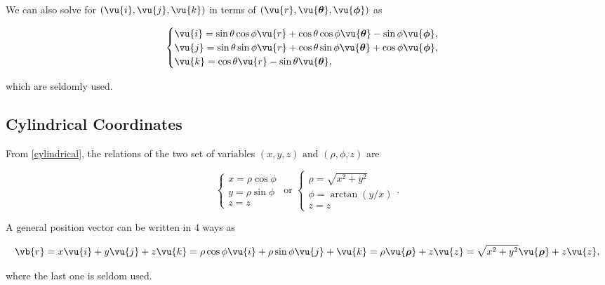 \documentclass[english,a4paper,12pt]{report}
\begin{document}
We can also solve for \((\vu{i} , \vu{j}, \vu{k} )\) in terms of \((\vu{r} , \vu{\boldsymbol{\theta } }, \vu{\boldsymbol{\phi } } )\) as  

\begin{equation}
    \begin{cases}
        \vu{i} = \sin \theta \cos \phi \vu{r} + \cos \theta \cos \phi \vu{\boldsymbol{\theta } } - \sin \phi \vu{\boldsymbol{\phi } }, \\
        \vu{j} = \sin \theta \sin \phi \vu{r} + \cos \theta \sin \phi \vu{\boldsymbol{\theta } } + \cos \phi \vu{\boldsymbol{\phi } }, \\
        \vu{k} = \cos \theta \vu{r} - \sin \theta \vu{\boldsymbol{\theta } },
    \end{cases}
\end{equation}

which are seldomly used.



	
\subsection{Cylindrical Coordinates}

From \cref{cylindrical}, the relations of the two set of variables \((x,y,z) \text { and } (\rho , \phi , z)\)  are

\begin{equation}
    \begin{cases} x = \rho \cos \phi \\ y = \rho \sin \phi \\ z = z \end{cases} \text { or } \begin{cases} \rho  = \sqrt{x^2+y^2} \\  \phi = \arctan {\left( y /x  \right)} \\ z = z \end{cases}. 
\end{equation}

A general position vector can be written in 4 ways as

\begin{equation}
    \vb{r} = x \vu{i} + y \vu{j} + z \vu{k} = \rho \cos \phi  \vu{i} + \rho \sin \phi \vu{j} + \vu{k} = \rho \vu{\boldsymbol{\rho } } + z \vu{z} = \sqrt{x^2+y^2}\vu{\boldsymbol{\rho } } + z \vu{z} , 
\end{equation}

where the last one is seldom used.
\end{document}
